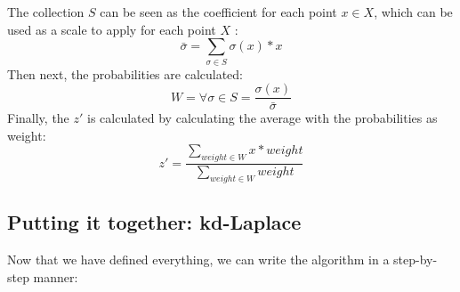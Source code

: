 The collection $S$ can be seen as the coefficient for each point $x \in X$, which can be used as a scale to apply for each point $X$ \citep{chatzikokolakis_efficient_2017}:
\begin{equation}
  \bar{\sigma} = \sum_{\sigma \in S} \sigma(x) * x
  \label{eq:optimal-remapping-formula-2}
\end{equation}
Then next, the probabilities are calculated:
\begin{equation}
  W = \forall \sigma \in S = \frac{\sigma(x)}{\bar{\sigma}}
  \label{eq:optimal-remapping-formula-3}
\end{equation}
Finally, the $z'$ is calculated by calculating the average with the probabilities as weight:
\begin{equation}
  z' = \frac{\sum_{weight \in W} x * weight }{\sum_{weight \in W} weight}
  \label{eq:optimal-remapping-formula-4}
\end{equation}


\newpage
\subsection{Putting it together: kd-Laplace}
Now that we have defined everything, we can write the algorithm in a step-by-step manner:


